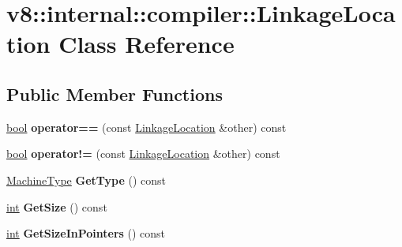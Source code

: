 \hypertarget{classv8_1_1internal_1_1compiler_1_1LinkageLocation}{}\section{v8\+:\+:internal\+:\+:compiler\+:\+:Linkage\+Location Class Reference}
\label{classv8_1_1internal_1_1compiler_1_1LinkageLocation}
\subsection*{Public Member Functions}
\begin{DoxyCompactItemize}
\item 
\mbox{\label{classv8_1_1internal_1_1compiler_1_1LinkageLocation_a4dc0a9e9fc9128b972e83370e39052fc}} 
\mbox{\hyperlink{classbool}{bool}} {\bfseries operator==} (const \mbox{\hyperlink{classv8_1_1internal_1_1compiler_1_1LinkageLocation}{Linkage\+Location}} \&other) const
\item 
\mbox{\label{classv8_1_1internal_1_1compiler_1_1LinkageLocation_a9ba2390820ca433e2cabeadd17114c26}} 
\mbox{\hyperlink{classbool}{bool}} {\bfseries operator!=} (const \mbox{\hyperlink{classv8_1_1internal_1_1compiler_1_1LinkageLocation}{Linkage\+Location}} \&other) const
\item 
\mbox{\label{classv8_1_1internal_1_1compiler_1_1LinkageLocation_aee15f02bd0636cf0af10f395a81a2d53}} 
\mbox{\hyperlink{classv8_1_1internal_1_1MachineType}{Machine\+Type}} {\bfseries Get\+Type} () const
\item 
\mbox{\label{classv8_1_1internal_1_1compiler_1_1LinkageLocation_a87cea25a317a520353a31c7c081db3c7}} 
\mbox{\hyperlink{classint}{int}} {\bfseries Get\+Size} () const
\item 
\mbox{\label{classv8_1_1internal_1_1compiler_1_1LinkageLocation_a7b7f186ce9b73f4657e4fcaae74ec697}} 
\mbox{\hyperlink{classint}{int}} {\bfseries Get\+Size\+In\+Pointers} () const
\item 
\mbox{\label{classv8_1_1internal_1_1compiler_1_1LinkageLocation_a8dd2751396ea5c849b642c698386da3d}} 

\end{DoxyCompactItemize}

